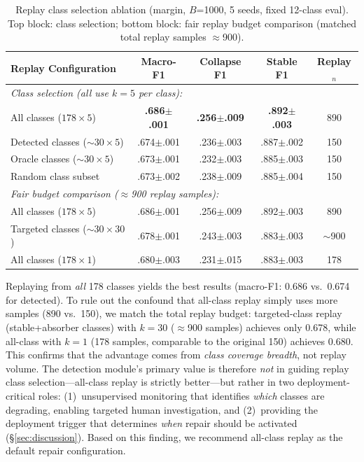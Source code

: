 \documentclass[journal]{IEEEtran}
\begin{document}
\begin{table}[t]
\centering
\caption{Replay class selection ablation (margin, $B$=1000, 5 seeds, fixed 12-class eval). Top block: class selection; bottom block: fair replay budget comparison (matched total replay samples $\approx$900).}
\label{tab:detect_necessity}
\small
\begin{tabular}{@{}l cccc@{}}
\toprule
Replay Configuration & Macro-F1 & Collapse F1 & Stable F1 & Replay$_n$ \\
\midrule
\multicolumn{5}{l}{\textit{Class selection (all use $k{=}5$ per class):}} \\
All classes ($178{\times}5$) & \textbf{.686$\pm$.001} & \textbf{.256$\pm$.009} & \textbf{.892$\pm$.003} & 890 \\
Detected classes (${\sim}30{\times}5$) & .674$\pm$.001 & .236$\pm$.003 & .887$\pm$.002 & 150 \\
Oracle classes (${\sim}30{\times}5$) & .673$\pm$.001 & .232$\pm$.003 & .885$\pm$.003 & 150 \\
Random class subset & .673$\pm$.002 & .238$\pm$.009 & .885$\pm$.004 & 150 \\
\midrule
\multicolumn{5}{l}{\textit{Fair budget comparison (${\approx}$900 replay samples):}} \\
All classes ($178{\times}5$) & .686$\pm$.001 & .256$\pm$.009 & .892$\pm$.003 & 890 \\
Targeted classes (${\sim}30{\times}30$) & .678$\pm$.001 & .243$\pm$.003 & .883$\pm$.003 & $\sim$900 \\
All classes ($178{\times}1$) & .680$\pm$.003 & .231$\pm$.015 & .883$\pm$.003 & 178 \\
\bottomrule
\end{tabular}
\end{table}

Replaying from \textit{all} 178 classes yields the best results (macro-F1: 0.686 vs.\ 0.674 for detected).
To rule out the confound that all-class replay simply uses more samples (890 vs.\ 150), we match the total replay budget: targeted-class replay (stable+absorber classes) with $k{=}30$ ($\approx$900 samples) achieves only 0.678, while all-class with $k{=}1$ (178 samples, comparable to the original 150) achieves 0.680.
This confirms that the advantage comes from \textit{class coverage breadth}, not replay volume.
The detection module's primary value is therefore \textit{not} in guiding replay class selection---all-class replay is strictly better---but rather in two deployment-critical roles: (1)~unsupervised monitoring that identifies \textit{which} classes are degrading, enabling targeted human investigation, and (2)~providing the deployment trigger that determines \textit{when} repair should be activated (\S\ref{sec:discussion}).
Based on this finding, we recommend all-class replay as the default repair configuration.
\end{document}
